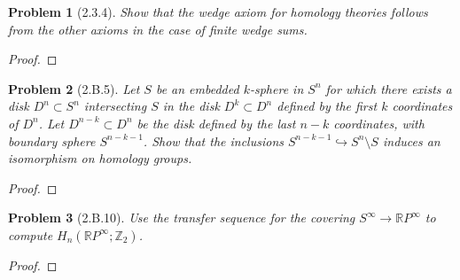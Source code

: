 \documentclass[10pt]{article}
\newcommand{\sk}{\vskip 10mm}
\newcommand{\bb}[1]{\mathbb{#1}}
\theoremstyle{plain}
\newtheorem{problem}{Problem}
\theoremstyle{remark}
\begin{document}
\sk

\begin{problem}[2.3.4]
  Show that the wedge axiom for homology theories follows from the other
  axioms in the case of finite wedge sums.
\end{problem}

\begin{proof}
  
\end{proof}

\sk

\begin{problem}[2.B.5]
  Let $S$ be an embedded $k$-sphere in $S^n$ for which there exists a disk
  $D^n\subset S^n$ intersecting $S$ in the disk $D^k\subset D^n$ defined by the
  first $k$ coordinates of $D^n$. Let $D^{n-k}\subset D^n$ be the disk defined
  by the last $n-k$ coordinates, with boundary sphere $S^{n-k-1}$. Show that the
  inclusions $S^{n-k-1}\hookrightarrow S^n\setminus S$ induces an isomorphism on
  homology groups.
\end{problem}

\begin{proof}
  
\end{proof}

\sk

\begin{problem}[2.B.10]
  Use the transfer sequence for the covering $S^\infty\rightarrow\bb{R}P^\infty$
  to compute  $H_n(\bb{R}P^\infty;\bb{Z}_2)$.
\end{problem}

\begin{proof}
  
\end{proof}

\end{document}
